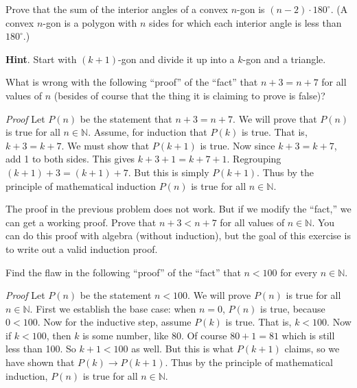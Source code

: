 \documentclass[11pt,]{book}
\makeatletter
\theoremstyle{ptxplainnotitle}
\theoremstyle{ptxplaintitle}
\renewcommand*{\proofname}{Proof}
\renewenvironment{proof}[1][\proofname]{\par
  \pushQED{\qed}%
  \normalfont \topsep6\p@\@plus6\p@\relax
  \trivlist
  \item\relax
    {\itshape
    #1\@addpunct{.}}\hspace\labelsep\ignorespaces
}{%
  \popQED\endtrivlist\@endpefalse
}
\theoremstyle{ptxdefinitionnotitle}
\theoremstyle{ptxdefinitiontitle}
\theoremstyle{ptxdefinitionnotitle}
\theoremstyle{ptxdefinitiontitle}
\theoremstyle{ptxdefinitionnotitle}
\theoremstyle{ptxdefinitiontitle}
\theoremstyle{ptxdefinitiontitlenonumber}
\theoremstyle{ptxdefinitiontitlenonumber}
\numberwithin{equation}{chapter}
\newcommand{\N}{\mathbb N}
\newcommand{\imp}{\rightarrow}
\newcommand{\lt}{<}
\makeatother
\begin{document}
\begin{divisionexercise}{11}\hypertarget{exercise-64}{}
\hypertarget{p-614}{}%
Prove that the sum of the interior angles of a convex \(n\)-gon is \((n-2)\cdot 180^\circ\).  (A convex \(n\)-gon is a polygon with \(n\) sides for which each interior angle is less than \(180^\circ\).)%
\par\smallskip%
\noindent\textbf{Hint}.\hypertarget{hint-3}{}\quad%
\hypertarget{p-615}{}%
Start with \((k+1)\)-gon and divide it up into a \(k\)-gon and a triangle.%
\end{divisionexercise}%
\begin{divisionexercise}{12}\hypertarget{exercise-65}{}
\hypertarget{p-621}{}%
What is wrong with the following ``proof'' of the ``fact'' that \(n+3 = n+7\) for all values of \(n\) (besides of course that the thing it is claiming to prove is false)?%
\begin{proof}\hypertarget{proof-11}{}
\hypertarget{p-622}{}%
Let \(P(n)\) be the statement that \(n + 3 = n + 7\). We will prove that \(P(n)\) is true for all \(n \in \N\). Assume, for induction that \(P(k)\) is true. That is, \(k+3 = k+7\). We must show that \(P(k+1)\) is true. Now since \(k + 3 = k + 7\), add 1 to both sides. This gives \(k + 3 + 1 = k + 7 + 1\). Regrouping \((k+1) + 3 = (k+1) + 7\). But this is simply \(P(k+1)\). Thus by the principle of mathematical induction \(P(n)\) is true for all \(n \in \N\).%
\end{proof}
\end{divisionexercise}%
\begin{divisionexercise}{13}\hypertarget{exercise-66}{}
\hypertarget{p-624}{}%
The proof in the previous problem does not work. But if we modify the ``fact,'' we can get a working proof. Prove that \(n + 3 \lt  n + 7\) for all values of \(n \in \N\). You can do this proof with algebra (without induction), but the goal of this exercise is to write out a valid induction proof.%
\end{divisionexercise}%
\begin{divisionexercise}{14}\hypertarget{exercise-67}{}
\hypertarget{p-626}{}%
Find the flaw in the following ``proof'' of the ``fact'' that \(n \lt  100\) for every \(n \in \N\).%
\begin{proof}\hypertarget{proof-13}{}
\hypertarget{p-627}{}%
Let \(P(n)\) be the statement \(n \lt  100\). We will prove \(P(n)\) is true for all \(n \in \N\). First we establish the base case: when \(n = 0\), \(P(n)\) is true, because \(0 \lt  100\). Now for the inductive step, assume \(P(k)\) is true. That is, \(k \lt  100\). Now if \(k \lt  100\), then \(k\) is some number, like 80. Of course \(80+1 = 81\) which is still less than 100. So \(k +1 \lt  100\) as well. But this is what \(P(k+1)\) claims, so we have shown that \(P(k) \imp P(k+1)\). Thus by the principle of mathematical induction, \(P(n)\) is true for all \(n \in \N\).%
\end{proof}
\end{divisionexercise}%
\end{document}
